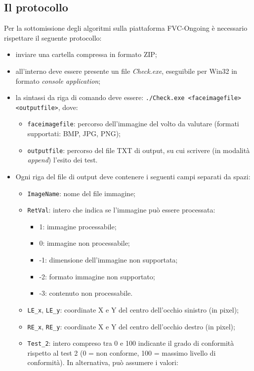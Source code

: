 \documentclass[12pt,a4paper,openright,twoside]{book}
\begin{document}
\subsection{Il protocollo}
Per la sottomissione degli algoritmi sulla piattaforma FVC-Ongoing è necessario rispettare il seguente protocollo:
\begin{itemize}
    \item inviare una cartella compressa in formato ZIP;
    \item all'interno deve essere presente un file \textit{Check.exe}, eseguibile per Win32 in formato \textit{console application};
    \item la sintassi da riga di comando deve essere: \texttt{./Check.exe <faceimagefile> <outputfile>}, dove:
    \begin{itemize}
        \item \texttt{faceimagefile}: percorso dell'immagine del volto da valutare (formati supportati: BMP, JPG, PNG);
        \item \texttt{outputfile}: percorso del file TXT di output, su cui scrivere (in modalità \textit{append}) l'esito dei test.
    \end{itemize}
    \item Ogni riga del file di output deve contenere i seguenti campi separati da spazi:
    \begin{itemize}
        \item \texttt{ImageName}: nome del file immagine;
        \item \texttt{RetVal}: intero che indica se l'immagine può essere processata:
        \begin{itemize}
            \item 1: immagine processabile;
            \item 0: immagine non processabile;
            \item -1: dimensione dell'immagine non supportata;
            \item -2: formato immagine non supportato;
            \item -3: contenuto non processabile.
        \end{itemize}
        \item \texttt{LE\_x}, \texttt{LE\_y}: coordinate X e Y del centro dell'occhio sinistro (in pixel);
        \item \texttt{RE\_x}, \texttt{RE\_y}: coordinate X e Y del centro dell'occhio destro (in pixel);
        \item \texttt{Test\_2}: intero compreso tra 0 e 100 indicante il grado di conformità rispetto al test 2 (0 = non conforme, 100 = massimo livello di conformità). In alternativa, può assumere i valori:

\end{itemize}
\end{itemize}
\end{document}
